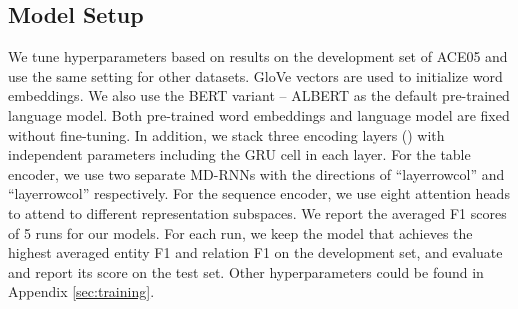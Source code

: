 \documentclass[11pt,a4paper]{article}
\begin{document}
\subsection{Model Setup}

We tune hyperparameters based on results on the development set of ACE05 and use the same setting for other datasets.
GloVe vectors \cite{pennington2014glove} are used to initialize word embeddings.
We also use the BERT variant -- ALBERT as the default pre-trained language model.
Both pre-trained word embeddings and language model are fixed without fine-tuning.
In addition, we stack three encoding layers () with independent parameters including the GRU cell in each layer.
For the table encoder, we use two separate MD-RNNs with the directions of ``layerrowcol'' and ``layerrowcol'' respectively.
For the sequence encoder, we use eight attention heads to attend to different representation subspaces.
We report the averaged F1 scores of 5 runs for our models.
For each run, we keep the model that achieves the highest averaged entity F1 and relation F1 on the development set, and evaluate and report its score on the test set.
Other hyperparameters could be found in Appendix \ref{sec:training}.
\end{document}
